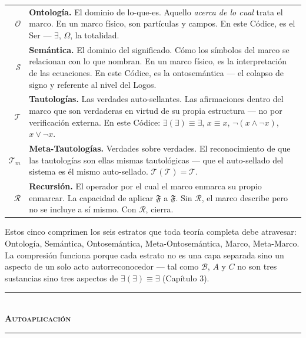 \documentclass[10pt, openany, oneside]{book}
\renewcommand{\normalsize}{\fontsize{10}{13}\selectfont}
\renewcommand{\footnotesize}{\fontsize{8.5}{11}\selectfont}
\begin{document}
{\footnotesize
\noindent\begin{tabular}{r p{}}
$\mathcal{O}$ & \textbf{Ontología.} El dominio de lo-que-es. Aquello \textit{acerca de lo cual} trata el marco. En un marco físico, son partículas y campos. En este Códice, es el Ser --- $\exists$, $\Omega$, la totalidad. \\[0.3em]
$\mathcal{S}$ & \textbf{Semántica.} El dominio del significado. Cómo los símbolos del marco se relacionan con lo que nombran. En un marco físico, es la interpretación de las ecuaciones. En este Códice, es la ontosemántica --- el colapso de signo y referente al nivel del Logos. \\[0.3em]
$\mathcal{T}$ & \textbf{Tautologías.} Las verdades auto-sellantes. Las afirmaciones dentro del marco que son verdaderas en virtud de su propia estructura --- no por verificación externa. En este Códice: $\exists(\exists) \equiv \exists$, $x \equiv x$, $\neg(x \wedge \neg x)$, $x \vee \neg x$. \\[0.3em]
$\mathcal{T}_m$ & \textbf{Meta-Tautologías.} Verdades sobre verdades. El reconocimiento de que las tautologías son ellas mismas tautológicas --- que el auto-sellado del sistema es él mismo auto-sellado. $\mathcal{T}(\mathcal{T}) = \mathcal{T}$. \\[0.3em]
$\mathcal{R}$ & \textbf{Recursión.} El operador por el cual el marco enmarca su propio enmarcar. La capacidad de aplicar $\mathfrak{F}$ a $\mathfrak{F}$. Sin $\mathcal{R}$, el marco describe pero no se incluye a sí mismo. Con $\mathcal{R}$, cierra. \\[0.3em]
\end{tabular}
}

\vspace{0.8em}

\noindent Estos cinco comprimen los seis estratos que toda teoría completa debe atravesar: Ontología, Semántica, Ontosemántica, Meta-Ontosemántica, Marco, Meta-Marco. La compresión funciona porque cada estrato no es una capa separada sino un aspecto de un solo acto autorreconocedor --- tal como $\mathcal{B}$, $A$ y $C$ no son tres sustancias sino tres aspectos de $\exists(\exists) \equiv \exists$ (Capítulo 3).

\vspace{1.5em}


\begin{center}
    \rule{0.3\textwidth}{0.4pt}\\[0.5em]
    {\normalsize\bfseries\scshape Autoaplicación}\\[0.3em]
    \rule{0.3\textwidth}{0.4pt}
\end{center}
\end{document}
